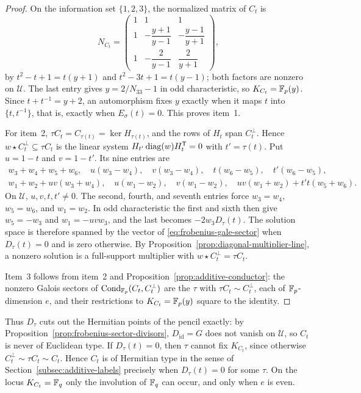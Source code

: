 \begin{proof}
On the information set \(\{1,2,3\}\), the normalized matrix of \(C_t\) is
\[
 N_{C_t}=
 \begin{pmatrix}
  1&1&1\\
  1&-\dfrac{y+1}{y-1}&-\dfrac{y-1}{y+1}\\[1ex]
  1&-\dfrac{2}{y-1}&\dfrac{2}{y+1}
 \end{pmatrix},
\]
by \(t^2-t+1=t(y+1)\) and \(t^2-3t+1=t(y-1)\); both factors are nonzero on
\(\mathcal U\).  The last entry gives \(y=2/N_{33}-1\) in odd characteristic,
so \(K_{C_t}=\mathbb F_p(y)\).  Since \(t+t^{-1}=y+2\), an automorphism fixes \(y\)
exactly when it maps \(t\) into \(\{t,t^{-1}\}\), that is, exactly when
\(E_\sigma(t)=0\).  This proves item~1.

For item~2, \(\tau C_t=C_{\tau(t)}=\ker H_{\tau(t)}\), and the rows of
\(H_t\) span \(C_t^\perp\).  Hence \(w\star C_t^\perp\subseteq\tau C_t\) is
the linear system \(H_{t'}\operatorname{diag}(w)H_t^{\mathsf T}=0\) with \(t'=\tau(t)\).  Put
\(u=1-t\) and \(v=1-t'\).  Its nine entries are
\[
\begin{gathered}
 w_3+w_4+w_5+w_6,\quad u(w_3-w_4),\quad v(w_3-w_4),\quad
 t(w_6-w_5),\quad t'(w_6-w_5),\\
 w_1+w_2+uv(w_3+w_4),\quad u(w_1-w_2),\quad v(w_1-w_2),\quad
 uv(w_1+w_2)+t't(w_5+w_6).
\end{gathered}
\]
On \(\mathcal U\), \(u,v,t,t'\ne0\).  The second, fourth, and seventh
entries force \(w_3=w_4\), \(w_5=w_6\), and \(w_1=w_2\).  In odd
characteristic the first and sixth then give \(w_5=-w_3\) and
\(w_1=-uvw_3\), and the last becomes \(-2w_3D_\tau(t)\).  The solution
space is therefore spanned by the vector of
\eqref{eq:frobenius-gale-sector} when \(D_\tau(t)=0\) and is zero
otherwise.  By Proposition~\ref{prop:diagonal-multiplier-line}, a nonzero
solution is a full-support multiplier with \(w\star C_t^\perp=\tau C_t\).

Item~3 follows from item~2 and Proposition~\ref{prop:additive-conductor}:
the nonzero Galois sectors of \(\operatorname{Cond}_{\mathbb F_p}(C_t,C_t^\perp)\) are the
\(\tau\) with \(\tau C_t\sim C_t^\perp\), each of \(\mathbb F_p\)-dimension \(e\),
and their restrictions to \(K_{C_t}=\mathbb F_p(y)\) square to the identity.
\end{proof}

Thus \(D_\tau\) cuts out the Hermitian points of the pencil exactly: by
Proposition~\ref{prop:frobenius-sector-divisors}, \(D_{\mathrm{id}}=G\) does
not vanish on \(\mathcal U\), so \(C_t\) is never of Euclidean type.  If
\(D_\tau(t)=0\), then \(\tau\) cannot fix \(K_{C_t}\), since otherwise
\(C_t^\perp\sim\tau C_t\sim C_t\).  Hence \(C_t\) is of Hermitian type in
the sense of Section~\ref{subsec:additive-labels} precisely when
\(D_\tau(t)=0\) for some \(\tau\).  On the locus \(K_{C_t}=\mathbb F_q\) only the involution of
\(\mathbb F_q\) can occur, and only when \(e\) is even.


